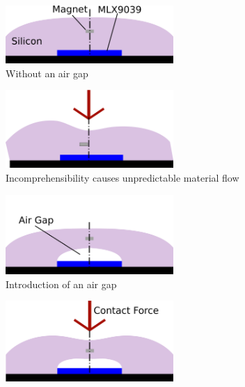 \begin{figure}
    \centering
    \begin{subfigure}{.45\linewidth}
        \centering
    \includegraphics[width=0.7\textwidth]{Images/nogap.png}
        \caption{Without an air gap}
        \label{fig:nogap}
    \end{subfigure}
    \begin{subfigure}{.45\linewidth}
        \centering
        \includegraphics[width=0.7\textwidth]{Images/nogapforce.png}
        \caption{Incomprehensibility causes unpredictable material flow }
        \label{fig:nogapforce}
    \end{subfigure}
    \begin{subfigure}{.45\linewidth}
        \centering
\includegraphics[width=0.7\textwidth]{Images/Airgap.png}
        \caption{Introduction of an air gap}
        \label{label:airgap}
    \end{subfigure}
    \begin{subfigure}{.45\linewidth}
        \centering
        \includegraphics[width=0.7\textwidth]{Images/airgapforce.png}          

\end{subfigure}
\end{figure}
